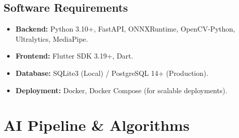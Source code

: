 \documentclass[12pt, a4paper]{report}
\begin{document}
\section{Software Requirements}
\begin{itemize}
    \item \textbf{Backend:} Python 3.10+, FastAPI, ONNXRuntime, OpenCV-Python, Ultralytics, MediaPipe.
    \item \textbf{Frontend:} Flutter SDK 3.19+, Dart.
    \item \textbf{Database:} SQLite3 (Local) / PostgreSQL 14+ (Production).
    \item \textbf{Deployment:} Docker, Docker Compose (for scalable deployments).
\end{itemize}

\chapter{AI Pipeline \& Algorithms}
\end{document}

